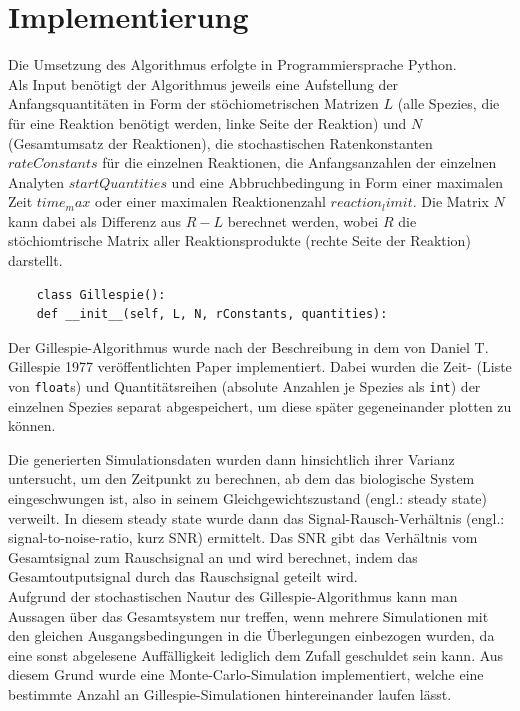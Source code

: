 \section{Implementierung}
Die Umsetzung des Algorithmus erfolgte in Programmiersprache Python.\\
Als Input benötigt der Algorithmus jeweils eine Aufstellung der Anfangsquantitäten in Form der stöchiometrischen Matrizen $L$ (alle Spezies, die für eine Reaktion benötigt werden, linke Seite der Reaktion) und $N$ (Gesamtumsatz der Reaktionen), die stochastischen Ratenkonstanten $rateConstants$ für die einzelnen Reaktionen, die Anfangsanzahlen der einzelnen Analyten $startQuantities$ und eine Abbruchbedingung in Form einer maximalen Zeit $time_max$ oder einer maximalen Reaktionenzahl $reaction_limit$. Die Matrix $N$ kann dabei als Differenz aus $R-L$ berechnet werden, wobei $R$ die stöchiomtrische Matrix aller Reaktionsprodukte (rechte Seite der Reaktion) darstellt.
\begin{verbatim}
	class Gillespie():
	def __init__(self, L, N, rConstants, quantities):
\end{verbatim}
Der Gillespie-Algorithmus wurde nach der Beschreibung in dem von Daniel T. Gillespie 1977 veröffentlichten Paper\cite{Gillespie1977} implementiert. Dabei wurden die Zeit- (Liste von \texttt{float}s) und Quantitätsreihen (absolute Anzahlen je Spezies als \texttt{int}) der einzelnen Spezies separat abgespeichert, um diese später gegeneinander plotten zu können.\par

Die generierten Simulationsdaten wurden dann hinsichtlich ihrer Varianz untersucht, um den Zeitpunkt zu berechnen, ab dem das biologische System eingeschwungen ist, also in seinem Gleichgewichtszustand (engl.: steady state) verweilt. In diesem steady state wurde dann das Signal-Rausch-Verhältnis (engl.: signal-to-noise-ratio, kurz SNR) ermittelt. Das SNR gibt das Verhältnis vom Gesamtsignal zum Rauschsignal an und wird berechnet, indem das Gesamtoutputsignal durch das Rauschsignal geteilt wird.\\
Aufgrund der stochastischen Nautur des Gillespie-Algorithmus kann man Aussagen über das Gesamtsystem nur treffen, wenn mehrere Simulationen mit den gleichen Ausgangsbedingungen in die Überlegungen einbezogen wurden, da eine sonst abgelesene Auffälligkeit lediglich dem Zufall geschuldet sein kann. Aus diesem Grund wurde eine Monte-Carlo-Simulation implementiert, welche eine bestimmte Anzahl an Gillespie-Simulationen hintereinander laufen lässt.\par


